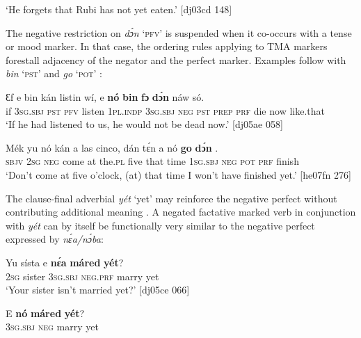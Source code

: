\glt ‘He forgets that Rubi has not yet eaten.’ [dj03cd 148]
\z

The negative restriction on \textit{dɔ́n} ‘\textsc{pfv}’ is suspended when it co-occurs with a tense or mood marker. In that case, the ordering rules applying to TMA markers forestall adjacency of the negator and the perfect marker. Examples follow with \textit{bin} ‘\textsc{pst}’  and \textit{go} ‘\textsc{pot}’ :


\ea%
    \label{ex:key:396}
    \gll Ɛf  e    bin  kán  listin  wí,    e    \textbf{nó}  \textbf{bin}
\textbf{fɔ} \textbf{dɔ́n}   náw    só.\\
if  \textsc{3sg.sbj}  \textsc{pst}  \textsc{pfv}  listen  \textsc{1pl.indp}  \textsc{3sg.sbj}  \textsc{neg}  \textsc{pst}
\textsc{prep}  \textsc{prf}  die  now    like.that\\

\glt ‘If he had listened to us, he would not be dead now.’ [dj05ae 058]
\z


\ea%
    \label{ex:key:397}
    \gll Mék    yu  nó  kán    a  las     cinco,  dán  tɛ́n  a    nó
\textbf{go}  \textbf{dɔ́n}  .\\
\textsc{sbjv}    \textsc{2sg}  \textsc{neg}  come  at  the.\textsc{pl}  five    that  time  \textsc{1sg.sbj}  \textsc{neg}
\textsc{pot}  \textsc{prf}  finish\\

\glt ‘Don’t come at five o’clock, (at) that time I won’t have finished yet.’ [he07fn 276]
\z

The clause-final adverbial \textit{yét} ‘yet’ may reinforce the negative perfect without contributing additional meaning . A negated factative{\fff} marked verb in conjunction with \textit{yét}  can by itself be functionally very similar to the negative perfect expressed by \textit{nɛ́a/nɔ́ba}:


\ea%
    \label{ex:key:398}
    \gll Yu  sísta    e    \textbf{nɛ́a}    \textbf{máred}  \textbf{yét}?\\
\textsc{2sg}  sister  \textsc{3sg.sbj}  \textsc{neg}.\textsc{prf}  marry  yet\\

\glt ‘Your sister isn’t married yet?’ [dj05ce 066]
\z


\ea%
    \label{ex:key:399}
    \gll E    \textbf{nó}  \textbf{máred}  \textbf{yét}?\\
\textsc{3sg.sbj}  \textsc{neg}  marry  yet\\

